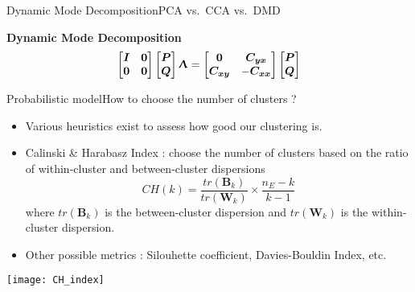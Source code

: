 \begin{frame}[t, c]{Dynamic Mode Decomposition}{PCA vs.\ CCA vs.\ DMD}
  \begin{block}{\centering \textbf{Dynamic Mode Decomposition}}
    $$
    \begin{bmatrix}
      \bm{I} & \bm{0} \\
      \bm{0} & \bm{0}
    \end{bmatrix}
    \begin{bmatrix}
      \bm{P} \\
      \bm{Q}
    \end{bmatrix}
    \boldsymbol{\Uplambda}
    =
    \begin{bmatrix}
      \bm{0} & \bm{C}_{\bm{yx}} \\
      \bm{C}_{\bm{xy}} & -\bm{C}_{\bm{xx}}
    \end{bmatrix}
    \begin{bmatrix}
      \bm{P} \\
      \bm{Q}
    \end{bmatrix}    
    $$
  \end{block}

  \vspace{1cm}
\end{frame}


\begin{frame}[t, c]{Probabilistic model}{How to choose the number of clusters ?}
  \begin{minipage}{.68\textwidth}
    \begin{itemize}
    \item Various heuristics exist to assess how good our clustering is.
      
      \medskip
      
    \item Calinski \& Harabasz Index : choose the number of clusters based on the ratio of within-cluster and between-cluster dispersions
      $$
      CH(k) = \frac{tr(\bm{B}_k)}{tr(\bm{W}_k)} \times \frac{n_E -k}{k-1}
      $$
      where $tr(\bm{B}_k)$ is the between-cluster dispersion and $tr(\bm{W}_k)$ is the within-cluster dispersion.
      
      \medskip
      
    \item Other possible metrics : Silouhette coefficient, Davies-Bouldin Index, etc.
    \end{itemize}
  \end{minipage}%
  \hfill
  \begin{minipage}{.28\textwidth}
    \centering
    \texttt{[image: CH\_index]}
  \end{minipage}

  \vspace{1cm}
\end{frame}


